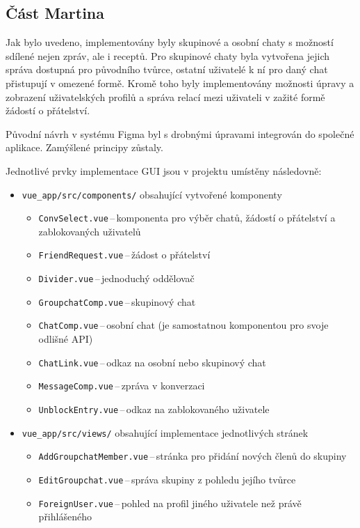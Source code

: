 \documentclass[a4paper, 11pt]{article}
\renewcommand{\t}[1]{\texttt{#1}} %
\begin{document}
\subsection{Část Martina}
Jak bylo uvedeno, implementovány byly skupinové a osobní chaty s možností sdílené nejen zpráv, ale i receptů.
Pro skupinové chaty byla vytvořena jejich správa dostupná pro původního tvůrce, ostatní uživatelé k ní
pro daný chat přistupují v omezené formě.
Kromě toho byly implementovány možnosti úpravy a zobrazení uživatelských profilů a správa
relací mezi uživateli v zažité formě žádostí o přátelství.

Původní návrh v systému Figma byl s drobnými úpravami integrován do společné aplikace.
Zamýšlené principy zůstaly.

Jednotlivé prvky implementace GUI jsou v projektu umístěny následovně:
\begin{itemize}
    \item \t{vue\_app/src/components/} obsahující vytvořené komponenty
        \begin{itemize}
            \item \t{ConvSelect.vue}\,--\,komponenta pro výběr chatů, žádostí o přátelství a zablokovaných uživatelů
            \item \t{FriendRequest.vue}\,--\,žádost o přátelství
            \item \t{Divider.vue}\,--\,jednoduchý oddělovač
            \item \t{GroupchatComp.vue}\,--\,skupinový chat
            \item \t{ChatComp.vue}\,--\,osobní chat (je samostatnou komponentou pro svoje odlišné API)
            \item \t{ChatLink.vue}\,--\,odkaz na osobní nebo skupinový chat
            \item \t{MessageComp.vue}\,--\,zpráva v konverzaci
            \item \t{UnblockEntry.vue}\,--\,odkaz na zablokovaného uživatele
        \end{itemize}
    \item \t{vue\_app/src/views/} obsahující implementace jednotlivých stránek
        \begin{itemize}
            \item \t{AddGroupchatMember.vue}\,--\,stránka pro přidání nových členů do skupiny
            \item \t{EditGroupchat.vue}\,--\,správa skupiny z pohledu jejího tvůrce
            \item \t{ForeignUser.vue}\,--\,pohled na profil jiného uživatele než právě přihlášeného

\end{itemize}
\end{itemize}
\end{document}
